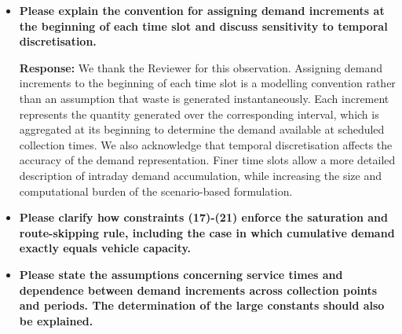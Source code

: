 \documentclass[11pt]{article}
\begin{document}
\begin{enumerate}
\begin{itemize}
\noindent\textbf{Response:} We thank the Reviewer for this observation. We confirm that waiting between consecutive visits is permitted in our formulation. This is an intentional modelling choice, since the amount of waste available for collection depends on the time at which a collection point is visited. Allowing waiting times enables the model to optimize both routing and scheduling decisions. Delaying a visit may reduce the amount of waste generated after collection, but it may also increase the quantity collected and the risk of vehicle capacity saturation. These trade-offs are accounted for in the objective function. No explicit monetary penalty is associated with waiting; however, waiting is subject to the overall planning horizon and may affect the resulting routing and collection costs.



\item \textbf{Please explain the convention for assigning demand increments at the beginning of each
time slot and discuss sensitivity to temporal discretisation.}



\noindent\textbf{Response:} We thank the Reviewer for this observation.  Assigning demand increments to the beginning of each time slot is a modelling convention rather than an assumption that waste is generated instantaneously. Each increment represents the quantity generated over the corresponding interval, which is aggregated at its beginning to determine the demand available at scheduled collection times. We also acknowledge that temporal discretisation affects the accuracy of the demand representation. Finer time slots allow a more detailed description of intraday demand accumulation, while increasing the size and computational burden of the scenario-based formulation.



\item \textbf{Please clarify how constraints (17)-(21) enforce the saturation and route-skipping rule,
including the case in which cumulative demand exactly equals vehicle capacity.}
\item \textbf{Please state the assumptions concerning service times and dependence between demand
increments across collection points and periods. The determination of the large constants
should also be explained.}
\end{itemize}



\end{enumerate}
\end{document}
